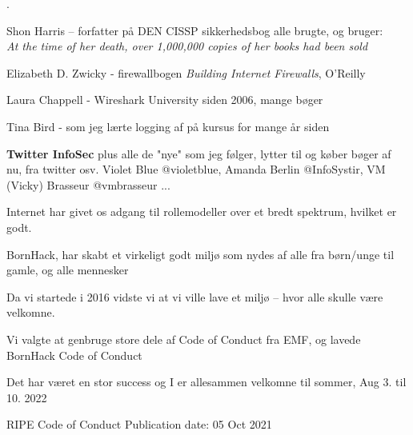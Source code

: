 \documentclass[Screen16to9,17pt]{foils}
\begin{document}

.

\begin{list2}
\item Shon Harris -- forfatter på DEN CISSP sikkerhedsbog alle brugte, og bruger:\\
\emph{At the time of her death, over 1,000,000 copies of her books had been
sold}\\
\item Elizabeth D. Zwicky - firewallbogen \emph{Building Internet Firewalls}, O'Reilly
\item Laura Chappell - Wireshark University siden 2006, mange bøger
\item Tina Bird - som jeg lærte logging af på kursus for mange år siden\\
\item {\bf Twitter InfoSec} plus alle de "nye" som jeg følger, lytter til og køber bøger af nu, fra twitter
osv. Violet Blue @violetblue, Amanda Berlin @InfoSystir, VM (Vicky) Brasseur
@vmbrasseur ...
\end{list2}

Internet har givet os adgang til rollemodeller over et bredt spektrum, hvilket er godt.



\begin{list2}
\item BornHack, har skabt et virkeligt godt miljø som nydes af alle fra børn/unge til gamle, og alle mennesker
\item Da vi startede i 2016 vidste vi at vi ville lave et miljø -- hvor alle skulle være velkomne.
\item Vi valgte at genbruge store dele af Code of Conduct fra EMF, og lavede BornHack Code of Conduct\\
\item Det har været en stor success og I er allesammen velkomne til sommer, Aug 3. til 10. 2022
\end{list2}




RIPE Code of Conduct
Publication date: 05 Oct 2021
\end{document}
